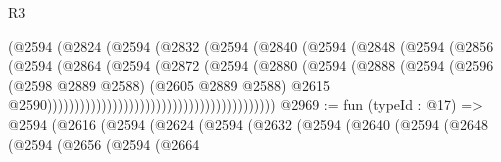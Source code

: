 \begin{lexlean}{R3}
\begin{coremodule}
                                                (@2594
                                                  (@2824
                                                    (@2594
                                                      (@2832
                                                        (@2594
                                                          (@2840
                                                            (@2594
                                                              (@2848
                                                                (@2594
                                                                  (@2856
                                                                    (@2594
                                                                      (@2864
                                                                        (@2594
                                                                          (@2872
                                                                            (@2594
                                                                              (@2880
                                                                                (@2594
                                                                                  (@2888
                                                                                    (@2594
                                                                                      (@2596
                                                                                        (@2598
                                                                                          @2889
                                                                                          @2588)
                                                                                        (@2605
                                                                                          @2889
                                                                                          @2588)
                                                                                        @2615
                                                                                        @2590))))))))))))))))))))))))))))))))))))))))))
@2969 := fun (typeId : @17) =>
  @2594
    (@2616
      (@2594
        (@2624
          (@2594
            (@2632
              (@2594
                (@2640
                  (@2594
                    (@2648
                      (@2594
                        (@2656
                          (@2594
                            (@2664

\end{coremodule}
\end{lexlean}

